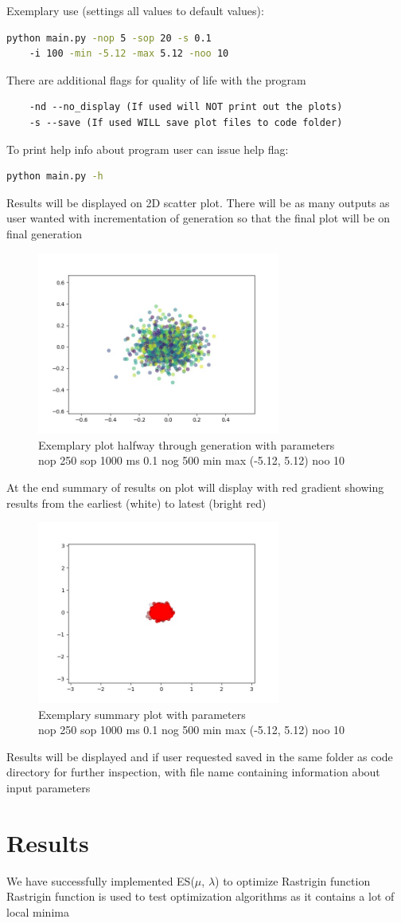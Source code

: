 \documentclass{article}[12pt]
\begin{document}
Exemplary use (settings all values to default values):
\begin{lstlisting}[language=bash]
    python main.py -nop 5 -sop 20 -s 0.1
    -i 100 -min -5.12 -max 5.12 -noo 10
\end{lstlisting}
There are additional flags for quality of life with the program
\begin{lstlisting}
    -nd --no_display (If used will NOT print out the plots)
    -s --save (If used WILL save plot files to code folder)
\end{lstlisting}
To print help info about program user can issue help flag:
\begin{lstlisting}[language=bash]
    python main.py -h
\end{lstlisting}
Results will be displayed on 2D scatter plot. There will be as many outputs as user wanted with incrementation of generation so that the final plot will be on final generation \\ 
\begin{figure}[H]
    \caption{Exemplary plot halfway through generation with parameters \\ nop 250 sop 1000 ms 0.1 nog 500 min max (-5.12, 5.12) noo 10 }
    \includegraphics[width=8cm]{example_halfway.jpg}
    \centering
    \end{figure}
At the end summary of results on plot will display with red gradient showing results from the earliest (white) to latest (bright red) \\  
\begin{figure}[H]
    \caption{Exemplary summary plot with parameters\\ nop 250 sop 1000 ms 0.1 nog 500 min max (-5.12, 5.12) noo 10 }
    \includegraphics[width=8cm]{example_summary.jpg}
    \centering
    \end{figure}
Results will be displayed and if user requested saved in the same folder as code directory for further inspection, with file name containing information about input parameters 
\section{Results}
We have successfully implemented ES($\mu$, $\lambda$) to optimize Rastrigin function \\ 
Rastrigin function is used to test optimization algorithms as it contains a lot of local minima 
\end{document}
